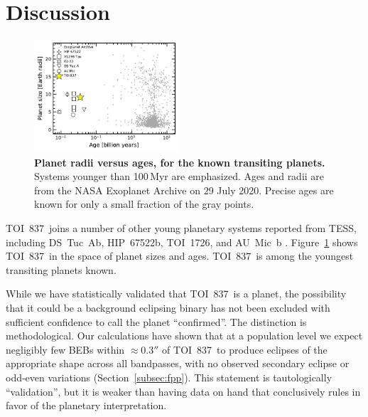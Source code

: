 \documentclass[12pt,twocolumn,tighten]{aastex63}
\newcommand{\tn}{TOI~837} %
\begin{document}
\section{Discussion}
\label{sec:discussion}

\begin{figure}[!t]
	\begin{center}
		\leavevmode
		\includegraphics[width=0.48\textwidth]{f11.pdf}
	\end{center}
	\vspace{-0.6cm}
	\caption{
    {\bf Planet radii versus ages, for the known transiting planets.} 
    Systems younger than 100$\,$Myr are emphasized.  Ages and radii
    are from the NASA Exoplanet Archive on 29 July 2020.  Precise ages
    are known for only a small fraction of the gray points.
		\label{fig:rpvsage}
	}
	\vspace{-0.2cm}
\end{figure}



\tn\ joins a number of other young planetary systems reported from
TESS, including DS~Tuc~Ab, HIP~67522b, TOI~1726, and AU~Mic~b
\citep{newton_tess_2019,zhou_well_2019,montet_young_2019,rizzuto_tess_2020,mann_tess_2020,plavchan_planet_2020,palle_transmission_2020,addison_youngest_2020,martioli_magnetism_2020,hirano_limits_2020}.
Figure~\ref{fig:rpvsage} shows \tn\ in the space of planet sizes and
ages.  \tn\ is among the youngest transiting planets known.  

While we have statistically validated that \tn\ is a planet, the
possibility that it could be a background eclipsing binary has not
been excluded with sufficient confidence to call the planet
``confirmed''.  The distinction is methodological.  Our calculations
have shown that at a population level we expect negligibly few BEBs
within $\approx0.3''$ of \tn\ to produce eclipses of the appropriate
shape across all bandpasses, with no observed secondary eclipse or
odd-even variations (Section~\ref{subsec:fpp}).  This statement is
tautologically ``validation'', but it is weaker than having data on
hand that conclusively rules in favor of the planetary interpretation.
\end{document}
